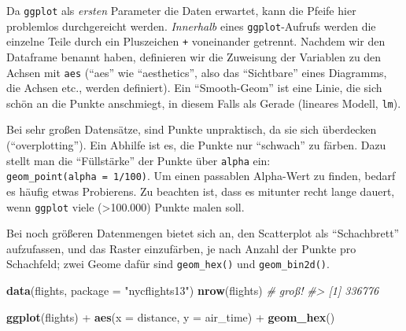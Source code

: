 \documentclass[12pt,ngerman,]{book}
\newenvironment{Shaded}{\begin{snugshade}}{\end{snugshade}}
\newcommand{\KeywordTok}[1]{\textcolor[rgb]{0.13,0.29,0.53}{\textbf{{#1}}}}
\newcommand{\DataTypeTok}[1]{\textcolor[rgb]{0.13,0.29,0.53}{{#1}}}
\newcommand{\DecValTok}[1]{\textcolor[rgb]{0.00,0.00,0.81}{{#1}}}
\newcommand{\StringTok}[1]{\textcolor[rgb]{0.31,0.60,0.02}{{#1}}}
\newcommand{\CommentTok}[1]{\textcolor[rgb]{0.56,0.35,0.01}{\textit{{#1}}}}
\newcommand{\NormalTok}[1]{{#1}}
\renewenvironment{Shaded}{\begin{kframe}}{\end{kframe}}
\begin{document}
\begin{Shaded}
\end{Shaded}

Da \texttt{ggplot} als \emph{ersten} Parameter die Daten erwartet, kann
die Pfeife hier problemlos durchgereicht werden. \emph{Innerhalb} eines
\texttt{ggplot}-Aufrufs werden die einzelne Teile durch ein Pluszeichen
\texttt{+} voneinander getrennt. Nachdem wir den Dataframe benannt
haben, definieren wir die Zuweisung der Variablen zu den Achsen mit
\texttt{aes} (``aes'' wie ``aesthetics'', also das ``Sichtbare'' eines
Diagramms, die Achsen etc., werden definiert). Ein ``Smooth-Geom'' ist
eine Linie, die sich schön an die Punkte anschmiegt, in diesem Falls als
Gerade (lineares Modell, \texttt{lm}).

Bei sehr großen Datensätze, sind Punkte unpraktisch, da sie sich
überdecken (``overplotting''). Ein Abhilfe ist es, die Punkte nur
``schwach'' zu färben. Dazu stellt man die ``Füllstärke'' der Punkte
über \texttt{alpha} ein: \texttt{geom\_point(alpha\ =\ 1/100)}. Um einen
passablen Alpha-Wert zu finden, bedarf es häufig etwas Probierens. Zu
beachten ist, dass es mitunter recht lange dauert, wenn \texttt{ggplot}
viele (\textgreater{}100.000) Punkte malen soll.

Bei noch größeren Datenmengen bietet sich an, den Scatterplot als
``Schachbrett'' aufzufassen, und das Raster einzufärben, je nach Anzahl
der Punkte pro Schachfeld; zwei Geome dafür sind \texttt{geom\_hex()}
und \texttt{geom\_bin2d()}.

\begin{Shaded}
\begin{Highlighting}[]
\KeywordTok{data}\NormalTok{(flights, }\DataTypeTok{package =} \StringTok{"nycflights13"}\NormalTok{)}
\KeywordTok{nrow}\NormalTok{(flights)  }\CommentTok{# groß!}
\CommentTok{#> [1] 336776}

\KeywordTok{ggplot}\NormalTok{(flights) +}
\StringTok{  }\KeywordTok{aes}\NormalTok{(}\DataTypeTok{x =} \NormalTok{distance, }\DataTypeTok{y =} \NormalTok{air_time) +}
\StringTok{  }\KeywordTok{geom_hex}\NormalTok{()}
\end{Highlighting}
\end{Shaded}
\end{document}
